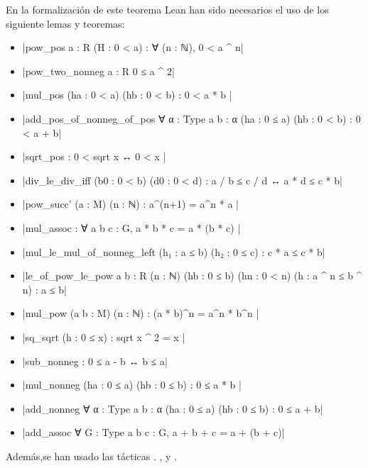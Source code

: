 En la formalización de este teorema Lean han sido necesarios el uso
de los siguiente lemas y teoremas:
\begin{itemize}
\item {}|pow_pos {a : R} (H : 0 < a) : ∀ (n : ℕ), 0 < a ^ n|
\item {}|pow_two_nonneg {a : R} 0 ≤ a ^ 2|
\item {}|mul_pos (ha : 0 < a) (hb : 0 < b) : 0 < a * b |
\item {}|add_pos_of_nonneg_of_pos ∀ {α : Type} {a b : α}
  (ha : 0 ≤ a) (hb : 0 < b) : 0 < a + b|
\item {}|sqrt_pos : 0 < sqrt x ↔ 0 < x |
\item {}|div_le_div_iff (b0 : 0 < b) (d0 : 0 < d) : a / b ≤ c / d ↔ a * d ≤ c * b|
\item {}|pow_succ' (a : M) (n : ℕ) : a^(n+1) = a^n * a |
\item {}|mul_assoc : ∀ a b c : G, a * b * c = a * (b * c) |
\item {}|mul_le_mul_of_nonneg_left (h₁ : a ≤ b) (h₂ : 0 ≤ c) : c * a ≤ c * b|
\item {}|le_of_pow_le_pow {a b : R} (n : ℕ) (hb : 0 ≤ b) (hn : 0 < n)
  (h : a ^ n ≤ b ^ n) : a ≤ b|
\item {}|mul_pow (a b : M) (n : ℕ) : (a * b)^n = a^n * b^n |
\item {}|sq_sqrt (h : 0 ≤ x) : sqrt x ^ 2 = x |
\item {}|sub_nonneg : 0 ≤ a - b ↔ b ≤ a|
\item {}|mul_nonneg (ha : 0 ≤ a) (hb : 0 ≤ b) : 0 ≤ a * b |
\item {}|add_nonneg ∀ {α : Type} {a b : α} (ha : 0 ≤ a) (hb : 0 ≤ b) :
  0 ≤ a + b|
\item {}|add_assoc ∀ {G : Type} {a b c : G}, a + b + c = a + (b + c)|
\end{itemize}
Además,se han usado las tácticas
.
,
 y
.


